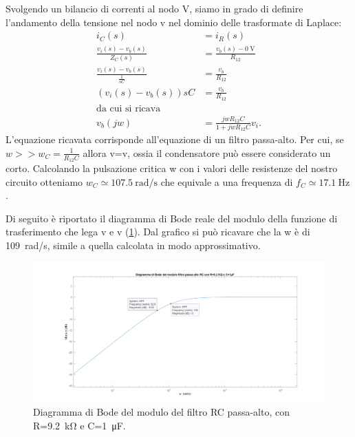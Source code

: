 Svolgendo un bilancio di correnti al nodo V, siamo in grado di definire l'andamento della tensione nel nodo v nel dominio delle trasformate di Laplace:
\begin{equation}
	\begin{split}
		i_C(s)&=i_R(s) \\
		\frac{v_i(s)-v_b(s)}{Z_C(s)}&=\frac{v_b(s)-\SI{0}{\volt}}{R_{12}} \\
		\frac{v_i(s)-v_b(s)}{\frac{1}{sC}}&=\frac{v_b}{R_{12}} \\
		(v_i(s)-v_b(s))sC&=\frac{v_b}{R_{12}} \\
		\text{da cui si ricava} \\
		v_b(jw)&=\frac{jwR_{12}C}{1+jwR_{12}C}v_i.
	\end{split}
\end{equation}
L'equazione ricavata corrisponde all'equazione di un filtro passa-alto. Per cui, se $w>>w_C=\frac{1}{R_{12}C}$ allora v=v, ossia il condensatore può essere considerato un corto. Calcolando la pulsazione critica w con i valori delle resistenze del nostro circuito otteniamo $w_C\simeq \SI{107.5}{\radian/\second}$ che equivale a una frequenza di $f_C\simeq\SI{17.1}{\hertz}$.

Di seguito è riportato il diagramma di Bode reale del modulo della funzione di trasferimento che lega v e v (\Fig\ref{fig:hpf}). Dal grafico si può ricavare che la w è di \SI{109}{\radian/\second}, simile a quella calcolata in modo approssimativo. 
\begin{figure}[h!]
	\centering
	\includegraphics[width=1\linewidth]{./OtherFiles/Laboratorio 4/boderc.png}
	\caption{Diagramma di Bode del modulo del filtro RC passa-alto, con R=\SI{9.2}{\kilo\ohm} e C=\SI{1}{\micro\farad}.}
	\label{fig:hpf}
\end{figure}

